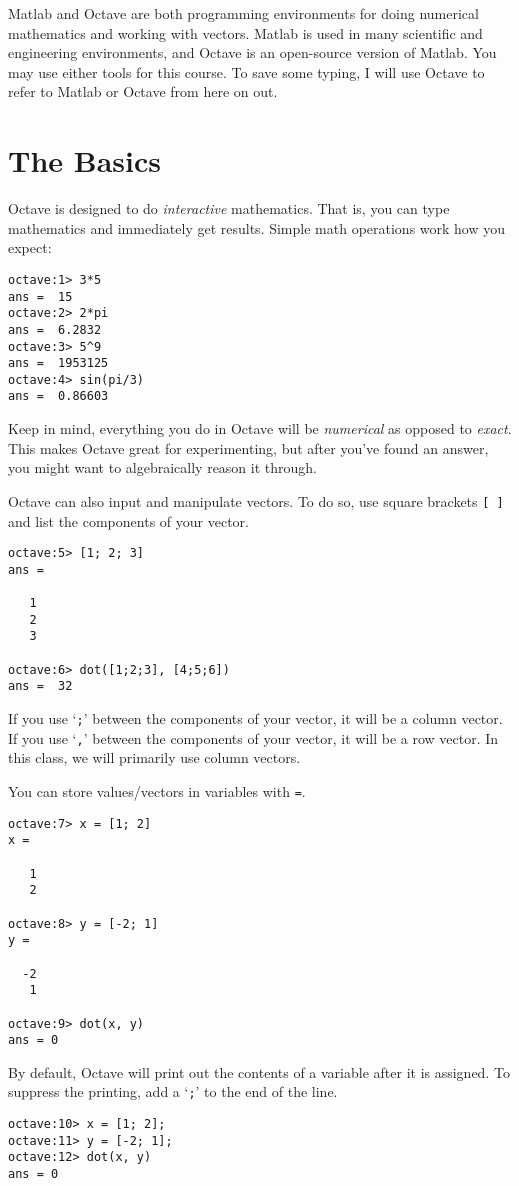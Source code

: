 \documentclass[letter]{article}
\begin{document}

	{\sc Matlab} and {\sc Octave} are both programming environments
	for doing numerical mathematics and working with vectors.  {\sc Matlab}
	is used in many scientific and engineering environments, and 
	{\sc Octave} is an open-source version of {\sc Matlab}.  You may use
	either tools for this course.  To save some typing, I will use 
	{\sc Octave} to refer to {\sc Matlab} or {\sc Octave} from here on out.

	\section{The Basics}
	{\sc Octave} is designed to do \emph{interactive} mathematics.  That is,
	you can type mathematics and immediately get results.  Simple math
	operations work how you expect:
\begin{lstlisting}[style=Matlab-Pyglike,escapechar=`]
octave:1> 3*5
ans =  15
octave:2> 2*pi
ans =  6.2832
octave:3> 5^9
ans =  1953125
octave:4> sin(pi/3)
ans =  0.86603
\end{lstlisting}

	Keep in mind, everything you do in {\sc Octave} will be \emph{numerical}
	as opposed to \emph{exact}.  This makes {\sc Octave} great for experimenting,
	but after you've found an answer, you might want to algebraically reason
	it through.

	{\sc Octave} can also input and manipulate vectors.  To do so, use square brackets
	{\tt [ ]} and list the components of your vector.
\begin{lstlisting}[style=Matlab-Pyglike,escapechar=`]
octave:5> [1; 2; 3]
ans =

   1
   2
   3

octave:6> dot([1;2;3], [4;5;6])
ans =  32
	\end{lstlisting}
	If you use `{\tt ;}' between the components of your vector, it will be a column vector.
	If you use `{\tt ,}' between the components of your vector, it will be a row vector.
	In this class, we will primarily use column vectors.

	You can store values/vectors in variables with {\tt =}.
	\begin{lstlisting}[style=Matlab-Pyglike,escapechar=`]
octave:7> x = [1; 2]
x =

   1
   2

octave:8> y = [-2; 1]
y =

  -2
   1

octave:9> dot(x, y)
ans = 0
	\end{lstlisting}
	By default, {\sc Octave} will print out the contents of a variable after it is assigned.  To suppress 
	the printing, add a `{\tt ;}' to the end of the line.
	\begin{lstlisting}[style=Matlab-Pyglike,escapechar=`]
octave:10> x = [1; 2];
octave:11> y = [-2; 1];
octave:12> dot(x, y)
ans = 0
	\end{lstlisting}
\end{document}
